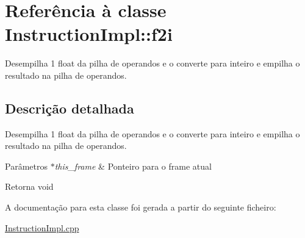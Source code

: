 \hypertarget{class_instruction_impl_1_1f2i}{}\section{Referência à classe Instruction\+Impl\+:\+:f2i}
\label{class_instruction_impl_1_1f2i}


Desempilha 1 float da pilha de operandos e o converte para inteiro e empilha o resultado na pilha de operandos.  




\subsection{Descrição detalhada}
Desempilha 1 float da pilha de operandos e o converte para inteiro e empilha o resultado na pilha de operandos. 


\begin{DoxyParams}{Parâmetros}
{\em $\ast$this\+\_\+frame} & Ponteiro para o frame atual \\
\hline
\end{DoxyParams}
\begin{DoxyReturn}{Retorna}
void 
\end{DoxyReturn}


A documentação para esta classe foi gerada a partir do seguinte ficheiro\+:\begin{DoxyCompactItemize}
\item 
\hyperlink{_instruction_impl_8cpp}{Instruction\+Impl.\+cpp}\end{DoxyCompactItemize}
